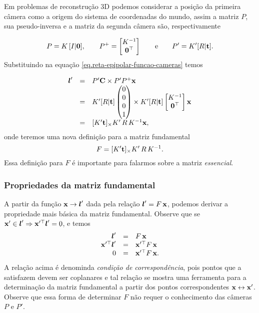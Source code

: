 Em problemas de reconstrução 3D podemos considerar a posição da primeira câmera como a origem do sistema de coordenadas do mundo, assim a matriz $P$, sua pseudo-inversa e a matriz da segunda câmera são, respectivamente 

\begin{equation*}
P=K\,[I|{\bf 0}],\qquad
P^+=
\begin{bmatrix}
K^{-1}\\
{\bf 0}^\top
\end{bmatrix}\qquad\text{e}\qquad
P'=K'[R|{\bf t}].
\end{equation*}
Substituindo na equação \ref{eq.reta-epipolar-funcao-cameras} temos

\begin{equation*}
\begin{array}{rcl}
\boldsymbol{l}'&=&P'{\bf C} \times P'P^+\mathbf{x}\\
&=&K'[R|{\bf t}]
\begin{pmatrix}
0\\
0\\
0\\
1
\end{pmatrix}
\times K'[R|{\bf t}]
\begin{bmatrix}
K^{-1}\\
{\bf 0}^\top
\end{bmatrix}\mathbf{x}\\
&=&
[K'{\bf t}]_\times K'\,R\,K^{-1}\mathbf{x},
\end{array}
\end{equation*}
onde teremos uma nova definição para a matriz fundamental 
\begin{equation}\label{eq.definicao-F}
F=[K'{\bf t}]_\times K'\,R\,K^{-1}.
\end{equation}
Essa definição para $F$ é importante para falarmos sobre a matriz {\it essencial}.

\subsubsection{Propriedades da matriz fundamental}\label{sec.propriedades-F}
A partir da função $\mathbf{x}\rightarrow\boldsymbol{l}'$ dada pela relação $\boldsymbol{l}'=F\,\mathbf{x}$, podemos derivar a propriedade mais básica da matriz fundamental.
Observe que se $\mathbf{x}'\in\boldsymbol{l}'\Rightarrow\mathbf{x}'^\top\boldsymbol{l}'=0$, e temos
\begin{equation*}
\begin{array}{rcl}
\boldsymbol{l}'&=&F\,\mathbf{x}\\
\mathbf{x}'^\top\boldsymbol{l}'&=&\mathbf{x}'^\top F\,\mathbf{x}\\
0&=&\mathbf{x}'^\top F\,\mathbf{x}.
\end{array}
\end{equation*}
A relação acima é denominda {\it condição de correspondência}, pois pontos que a satisfazem devem ser  coplanares e tal relação se mostra uma ferramenta para a determinação da matriz fundamental a partir dos pontos correspondentes $\mathbf{x}\leftrightarrow\mathbf{x}'$. Observe que essa forma de determinar $F$ não requer o conhecimento das câmeras $P$ e $P'$. 

